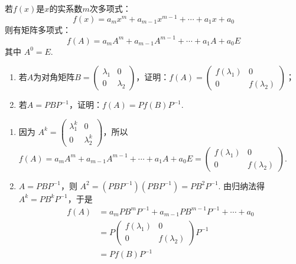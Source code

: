 \begin{exercise}
\begin{exgroup}
        \item 若$f(x)$是$x$的实系数$m$次多项式：
        \[f(x)=a_mx^m+a_{m-1}x^{m-1}+\cdots+a_1x+a_0\]
        则有矩阵多项式：
        \[f(A)=a_mA^m+a_{m-1}A^{m-1}+\cdots+a_1A+a_0E\]
        其中 $A^0=E$.
        \begin{enumerate}
            \item 若$A$为对角矩阵$B=\begin{pmatrix}
                          \lambda_1 & 0 \\ 0 & \lambda_2
                      \end{pmatrix}$，证明：$f(A)=\begin{pmatrix}
                          f(\lambda_1) & 0 \\ 0 & f(\lambda_2)
                      \end{pmatrix}$；

            \item 若$A=PBP^{-1}$，证明：$f(A)=Pf(B)P^{-1}$.
        \end{enumerate}
        \begin{answer}
            \begin{enumerate}
                \item 因为 $A^k=\begin{pmatrix}\lambda_1^k & 0 \\ 0 & \lambda_2^k\end{pmatrix}$，所以 $f(A)=a_mA^m+a_{m-1}A^{m-1}+\cdots+a_1A+a_0E = \begin{pmatrix}f(\lambda_1) & 0 \\ 0 & f(\lambda_2)\end{pmatrix}$.
                \item $A=PBP^{-1}$，则 $A^2=(PBP^{-1})(PBP^{-1})=PB^2P^{-1}$. 由归纳法得 $A^k=PB^kP^{-1}$，于是
                      \begin{align*}
                          f(A) & = a_mPB^mP^{-1}+a_{m-1}PB^{m-1}P^{-1}+\cdots+a_0                         \\
                               & =P\begin{pmatrix}f(\lambda_1) & 0 \\ 0 & f(\lambda_2)\end{pmatrix}P^{-1} \\
                               & =Pf(B)P^{-1}
                      \end{align*}
            \end{enumerate}
        \end{answer}


\end{exgroup}
\end{exercise}

